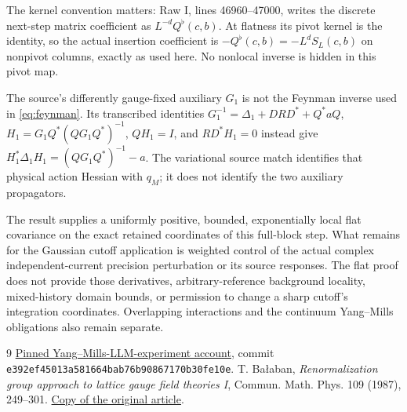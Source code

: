 \documentclass[11pt]{article}
\theoremstyle{remark}
\begin{document}
The kernel convention matters: Raw I, lines 46960--47000, writes
the discrete next-step matrix coefficient as $L^{-d}Q^\flat(c,b)$.
At flatness its pivot kernel is the identity, so the actual insertion
coefficient is $-Q^\flat(c,b)=-L^dS_L(c,b)$ on nonpivot columns,
exactly as used here. No nonlocal inverse is hidden in this pivot map.

The source's differently gauge-fixed auxiliary $G_1$ is not the
Feynman inverse used in \eqref{eq:feynman}. Its transcribed identities
$G_1^{-1}=\Delta_1+DRD^*+Q^*aQ$,
$H_1=G_1Q^*(QG_1Q^*)^{-1}$, $QH_1=I$, and $RD^*H_1=0$
instead give $H_1^*\Delta_1H_1=(QG_1Q^*)^{-1}-a$.
The variational source match identifies that physical action Hessian
with $q_M$; it does not identify the two auxiliary propagators.

The result supplies a uniformly positive, bounded, exponentially
local flat covariance on the exact retained coordinates of this
full-block step. What remains for the Gaussian cutoff application
is weighted control of the actual complex independent-current
precision perturbation or its source responses. The flat proof
does not provide those derivatives, arbitrary-reference background
locality, mixed-history domain bounds, or permission to change a
sharp cutoff's integration coordinates. Overlapping interactions
and the continuum Yang--Mills obligations also remain separate.

\begin{thebibliography}{9}
 \href{https://github.com/ethanwsussman/Yang--Mills-LLM-experiment/tree/e392ef45013a581664bab76b90867170b30fe10e}
{Pinned Yang--Mills-LLM-experiment account}, commit
\texttt{e392ef45013a581664bab76b90867170b30fe10e}.
 T. Ba\l aban,
\emph{Renormalization group approach to lattice gauge field theories I},
Commun. Math. Phys. 109 (1987), 249--301.
\href{https://scispace.com/pdf/renormalization-group-approach-to-lattice-gauge-field-3ygai0vxt1.pdf}
{Copy of the original article}.
\end{thebibliography}
\end{document}
